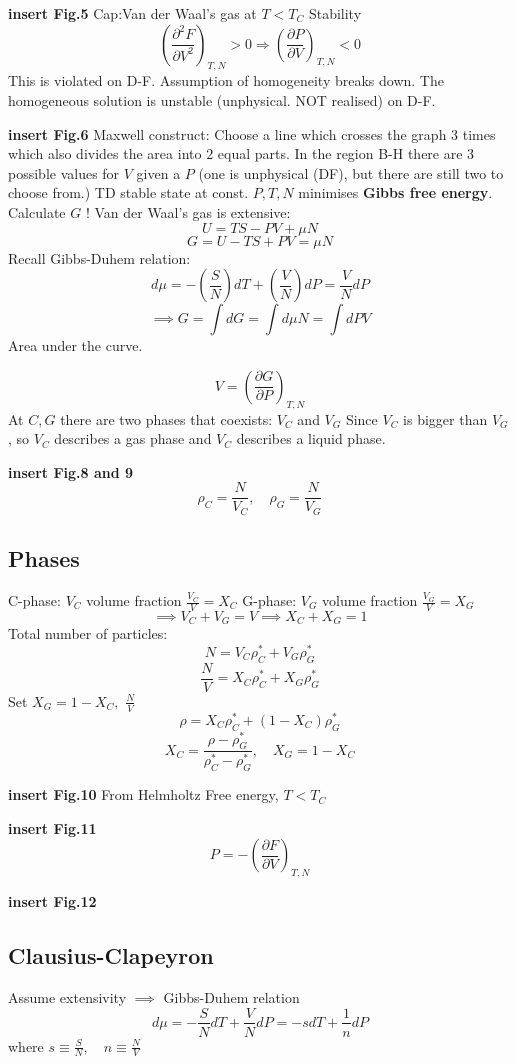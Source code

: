 \documentclass[11pt]{book}
\theoremstyle{definition}
\begin{document}
\textbf{insert Fig.5} 
Cap:Van der Waal's gas at $ T < T_C $ 
Stability
\[ \left (\frac{\partial ^2F}{\partial V^2} \right )_{T,N} > 0 \Rightarrow \left (\frac{\partial P}{\partial V} \right )_{T,N} < 0\] 
This is violated on D-F. Assumption of homogeneity breaks down. The homogeneous solution is unstable (unphysical. NOT realised) on D-F.

\textbf{insert Fig.6}
Maxwell construct: Choose a line which crosses the graph 3 times which also divides the area into $ 2 $ equal parts.
In the region B-H there are 3 possible values for $ V $ given a $ P $ (one is unphysical (DF), but there are still two to choose from.)
TD stable state at const. $ P,T,N $ minimises \textbf{Gibbs free energy}. 
Calculate $ G $ !
Van der Waal's gas is extensive: \[ U = TS - PV + \mu N \] 
\[ G = U - TS + PV = \mu N \] 
Recall Gibbs-Duhem relation: \[ d\mu = - \left(\frac{S}{N} \right)dT + \left( \frac{V}{N} \right) dP = \frac{V}{N}dP \] 
\[ \implies G = \int dG = \int d \mu N  = \int dP V\] Area under the curve.


\[ V = \left (\frac{\partial G}{\partial P} \right )_{T,N} \] 
At $ C,G $ there are two phases that coexists: $ V_C $ and $ V_G $
Since $ V_C $ is bigger than $ V_G $, so $ V_C $ describes a gas phase and $ V_C $ describes a liquid phase.

\textbf{insert Fig.8 and 9} 
\[ \rho _C = \frac{N}{V_C}, \quad \rho_G = \frac{N}{V_G} \] 

\subsection{Phases}
C-phase: $ V_C $ volume fraction $ \frac{V_C}{V} = X_C $ 
G-phase: $ V_G $ volume fraction $ \frac{V_G}{V} = X_G $ 
\[ \implies V_C + V_G = V \implies X_C + X_G = 1 \] 
Total number of particles:
\[ N = V_C \rho_C^{*} + V_G \rho_G^{*} \] 
\[ \frac{N}{V} = X_C \rho_{C}^{*} + X_G \rho_{G}^{*}   \] 
Set $ X_G = 1 - X_C, $ $ \frac{N}{V} $ 
\[ \rho = X_C \rho_C^{*} + (1-X_C) \rho_{G}^{*}  \] 
\[ X_C = \frac{\rho - \rho_{G}^{*} }{\rho_{C}^{*} - \rho_{G}^{*} }, \quad X_G = 1 - X_C\] 

\textbf{insert Fig.10} 
From Helmholtz Free energy, $ T < T_C $ 

\textbf{insert Fig.11} 
\[ P = - \left (\frac{\partial F}{\partial V} \right )_{T,N} \] 

\textbf{insert Fig.12} 
\subsection{Clausius-Clapeyron}
Assume extensivity $ \implies $ Gibbs-Duhem relation
\[ d\mu = -\frac{S}{N}dT + \frac{V}{N}dP = -sdT + \frac{1}{n}dP \] 
where $ s \equiv \frac{S}{N}, \quad n \equiv \frac{N}{V} $ 
\end{document}
